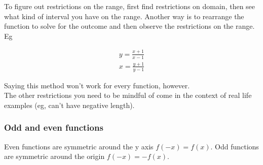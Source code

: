 \documentclass{article}
\begin{document}
To figure out restrictions on the range, first find restrictions on domain, then see what
kind of interval you have on the range. Another way is to rearrange the function to solve
for the outcome and then observe the restrictions on the range. Eg

\begin{align}
    y = \frac{x + 1}{x - 1}\\
    x = \frac{y + 1}{y - 1}
\end{align}

Saying this method won't work for every function, however.\\

The other restrictions you need to be mindful of come in the context of real life examples
(eg, can't have negative length).


\subsubsection{Odd and even functions}

Even functions are symmetric around the y axis $f(-x) = f(x)$. Odd functions are symmetric around the
origin $f(-x) = -f(x)$.
\end{document}
